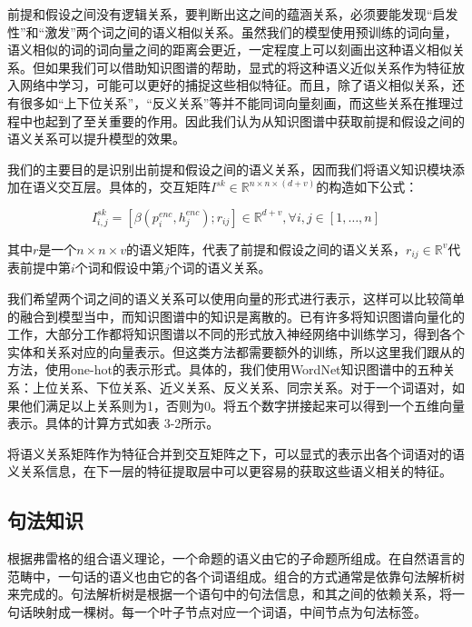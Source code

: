 \documentclass[UTF8,11pt,a4paper,nofonts]{ctexart}
\numberwithin{equation}{section}
\begin{document}
前提和假设之间没有逻辑关系，要判断出这之间的蕴涵关系，必须要能发现“启发性”和“激发”两个词之间的语义相似关系。虽然我们的模型使用预训练的词向量，语义相似的词的词向量之间的距离会更近，一定程度上可以刻画出这种语义相似关系。但如果我们可以借助知识图谱的帮助，显式的将这种语义近似关系作为特征放入网络中学习，可能可以更好的捕捉这些相似特征。而且，除了语义相似关系，还有很多如“上下位关系”，“反义关系”等并不能同词向量刻画，而这些关系在推理过程中也起到了至关重要的作用。因此我们认为从知识图谱中获取前提和假设之间的语义关系可以提升模型的效果。






我们的主要目的是识别出前提和假设之间的语义关系，因而我们将语义知识模块添加在语义交互层。具体的，交互矩阵$I^{sk} \in \mathbb{R}^{n \times n \times (d+v)}$的构造如下公式：

\begin{equation}
I^{sk}_{i,j} = [\beta(p^{enc}_i, h^{enc}_j); r_{ij}] \in \mathbb{R}^{d+v}, \forall i, j \in [1,\dots,n]
\end{equation}

其中$r$是一个$n\times n \times v$的语义矩阵，代表了前提和假设之间的语义关系，$r_{ij} \in \mathbb{R}^v$代表前提中第$i$个词和假设中第$j$个词的语义关系。

我们希望两个词之间的语义关系可以使用向量的形式进行表示，这样可以比较简单的融合到模型当中，而知识图谱中的知识是离散的。已有许多将知识图谱向量化的工作\cite{Lin2015LearningEA, Bordes2013TranslatingEF}，大部分工作都将知识图谱以不同的形式放入神经网络中训练学习，得到各个实体和关系对应的向量表示。但这类方法都需要额外的训练，所以这里我们跟从\cite{Chen2017NaturalLI}的方法，使用one-hot的表示形式。具体的，我们使用WordNet知识图谱中的五种关系：上位关系、下位关系、近义关系、反义关系、同宗关系。对于一个词语对，如果他们满足以上关系则为1，否则为0。将五个数字拼接起来可以得到一个五维向量表示。具体的计算方式如表 3-2所示。

将语义关系矩阵作为特征合并到交互矩阵之下，可以显式的表示出各个词语对的语义关系信息，在下一层的特征提取层中可以更容易的获取这些语义相关的特征。


\subsection{句法知识}

根据弗雷格的组合语义理论，一个命题的语义由它的子命题所组成。在自然语言的范畴中，一句话的语义也由它的各个词语组成。组合的方式通常是依靠句法解析树来完成的。句法解析树是根据一个语句中的句法信息，和其之间的依赖关系，将一句话映射成一棵树。每一个叶子节点对应一个词语，中间节点为句法标签。
\end{document}
